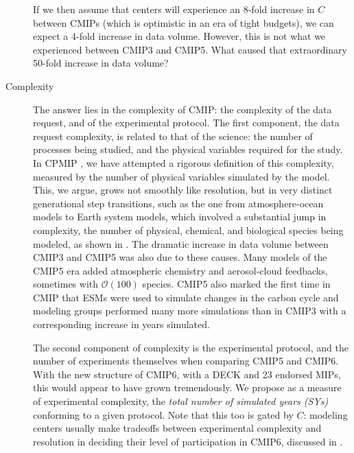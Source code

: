 \documentclass[gmd,manuscript]{copernicus}
\newcommand{\pllabel}[1]{\label{p-#1}\linelabel{l-#1}}
\begin{document}
\begin{description}
  If we then assume that centers will experience an 8-fold increase in
  $C$ between CMIPs (which is optimistic in an era of tight budgets),
  we can expect a 4-fold increase in data volume. However, this is not
  what we experienced between CMIP3 and CMIP5. What caused that
  extraordinary 50-fold increase in data volume?
\item[Complexity] The answer lies in the complexity of CMIP: the
  complexity of the data request, and of the experimental protocol.
  The first component, the
  \pllabel{RC1-19}
  data request complexity, is related to that of the science: the
  number of processes being studied, and the physical variables
  required for the study. In CPMIP \citep{ref:balajietal2017}, we have
  attempted a rigorous definition of this complexity, measured by the
  number of physical variables simulated by the model. This, we argue,
  grows not smoothly like resolution, but in very distinct
  generational step transitions, such as the one from atmosphere-ocean
  models to Earth system models, which involved a substantial jump in
  complexity, the number of physical, chemical, and biological species
  being modeled, as shown in \cite{ref:balajietal2017}.
  \pllabel{RC1-29a}
  The dramatic increase in data volume between CMIP3 and CMIP5 was
  also due to these causes. Many models of the CMIP5 era added
  atmospheric chemistry and aerosol-cloud feedbacks, sometimes with
  $\mathcal{O}(100)$ species. CMIP5 also marked the first time in CMIP
  that ESMs were used to simulate changes in the carbon cycle and
  modeling groups performed many more simulations than in CMIP3 with a
  corresponding increase in years simulated.

  The second component of complexity is the experimental protocol, and 
  the number of experiments themselves when comparing CMIP5 and CMIP6.
  With the new structure of CMIP6, with a DECK and 23 endorsed MIPs,
  this would appear to have grown tremendously. We propose as a
  measure of experimental complexity, the \emph{total number of 
  simulated years (SYs)} conforming to a given protocol. Note that
  this too is gated by $C$: modeling centers usually make tradeoffs
  between experimental complexity and resolution in deciding their
  level of participation in CMIP6, discussed in 
  \cite{ref:balajietal2017}.
\end{description}
\end{document}
